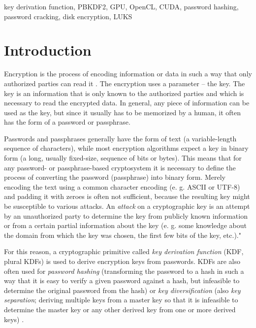 \documentclass[12pt,oneside]{fithesis2}
\begin{document}
    \begin{ThesisKeyWords}          %
      key derivation function, PBKDF2, GPU, OpenCL, CUDA, password hashing, password cracking, disk encryption, LUKS
    \end{ThesisKeyWords}
    
    \tableofcontents                %
  
  \MainMatter                     %
    \chapter{Introduction}          %
      Encryption is the process of encoding information or data in such a way that only authorized parties can read it \cite{appliedCrypto, foundations}. The encryption uses a parameter -- the key. The key is an information that is only known to the authorized parties and which is necessary to read the encrypted data. In general, any piece of information can be used as the key, but since it usually has to be memorized by a human, it often has the form of a password or passphrase.
    
      Passwords and passphrases generally have the form of text (a variable-length sequence of characters), while most encryption algorithms expect a key in binary form (a long, usually fixed-size, sequence of bits or bytes). This means that for any password- or pass\-phrase-based cryptosystem it is necessary to define the process of converting the password (passphrase) into binary form. Merely encoding the text using a common character encoding (e. g. ASCII or UTF-8) and padding it with zeroes is often not sufficient, because the resulting key might be susceptible to various attacks. An \emph{attack} on a cryptographic key is an attempt by an unauthorized party to determine the key from publicly known information or from a certain partial information about the key (e. g. some knowledge about the domain from which the key was chosen, the first few bits of the key, etc.)."
    
      For this reason, a cryptographic primitive called \emph{key derivation function} (KDF, plural KDFs) is used to derive encryption keys from passwords. KDFs are also often used for \emph{password hashing} (transforming the password to a hash in such a way that it is easy to verify a given password against a hash, but infeasible to determine the original password from the hash) or \emph{key diversification} (also \emph{key separation}; deriving multiple keys from a master key so that it is infeasible to determine the master key or any other derived key from one or more derived keys) \cite{wiki:KDF, nist:sp800:108}.
    
\end{document}
